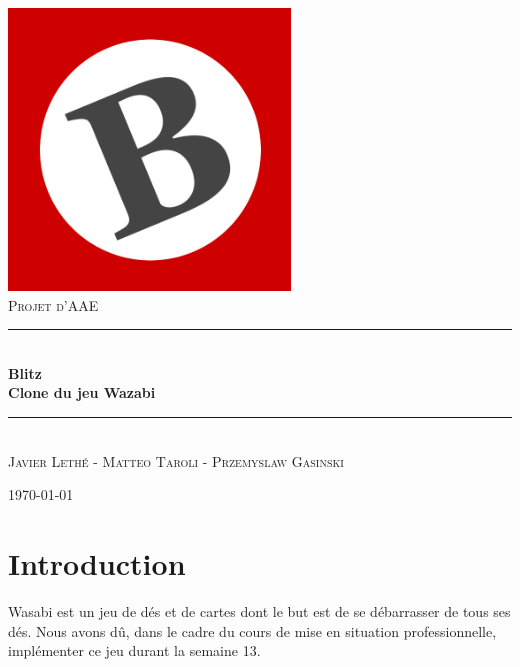 \documentclass[11pt]{scrreprt}
\begin{document}
    \renewcommand{\labelitemi}{$\bullet$}
    \renewcommand{\labelitemii}{$\circ$}


    \begin{titlepage}
        \begin{center}
            ~\\[1.5cm]
            \includegraphics[width=7.5cm]{images/blitzlogo.png}
            ~\\[1.5cm]


            \textsc{\Large Projet d'AAE}\\[0.5cm]

            \rule{\textwidth}{1pt} \\[0.4cm]
            { \bfseries \Huge{Blitz}\\ \Large{Clone du jeu Wazabi}\\[0.4cm]}

            \rule{\textwidth}{1pt} \\[1.5cm]

            \textsc{Javier Lethé - Matteo Taroli - Przemyslaw Gasinski}

            \vfill

            {\large \today}
            \vfill
        \end{center}
    \end{titlepage}
    \tableofcontents
    \pagebreak

    \setlength{\parskip}{3mm}

    \chapter{Introduction}
    Wasabi est un jeu de dés et de cartes dont le but est de se débarrasser de tous ses dés. Nous avons dû, dans le cadre du cours de mise en situation professionnelle, implémenter ce jeu durant la semaine 13.
\end{document}
